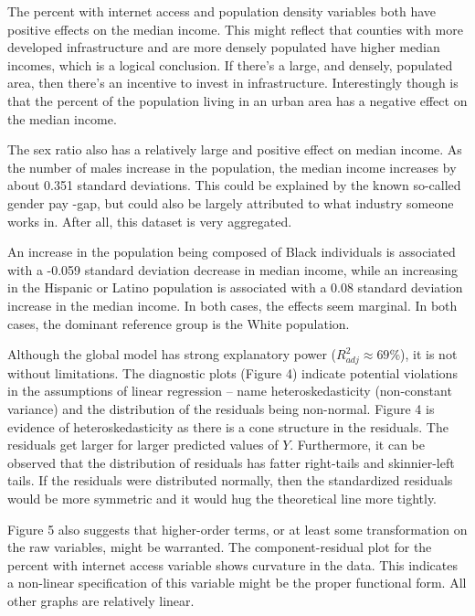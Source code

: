 \documentclass[
]{article}
\begin{document}
The percent with internet access and population density variables both
have positive effects on the median income. This might reflect that
counties with more developed infrastructure and are more densely
populated have higher median incomes, which is a logical conclusion. If
there's a large, and densely, populated area, then there's an incentive
to invest in infrastructure. Interestingly though is that the percent of
the population living in an urban area has a negative effect on the
median income.

The sex ratio also has a relatively large and positive effect on median
income. As the number of males increase in the population, the median
income increases by about 0.351 standard deviations. This could be
explained by the known so-called gender pay -gap, but could also be
largely attributed to what industry someone works in. After all, this
dataset is very aggregated.

An increase in the population being composed of Black individuals is
associated with a -0.059 standard deviation decrease in median income,
while an increasing in the Hispanic or Latino population is associated
with a 0.08 standard deviation increase in the median income. In both
cases, the effects seem marginal. In both cases, the dominant reference
group is the White population.

Although the global model has strong explanatory power
(\(R_{adj}^{2} \approx 69\%\)), it is not without limitations. The
diagnostic plots (Figure 4) indicate potential violations in the
assumptions of linear regression -- name heteroskedasticity
(non-constant variance) and the distribution of the residuals being
non-normal. Figure 4 is evidence of heteroskedasticity as there is a
cone structure in the residuals. The residuals get larger for larger
predicted values of \(Y\). Furthermore, it can be observed that the
distribution of residuals has fatter right-tails and skinnier-left
tails. If the residuals were distributed normally, then the standardized
residuals would be more symmetric and it would hug the theoretical line
more tightly.

Figure 5 also suggests that higher-order terms, or at least some
transformation on the raw variables, might be warranted. The
component-residual plot for the percent with internet access variable
shows curvature in the data. This indicates a non-linear specification
of this variable might be the proper functional form. All other graphs
are relatively linear.
\end{document}
